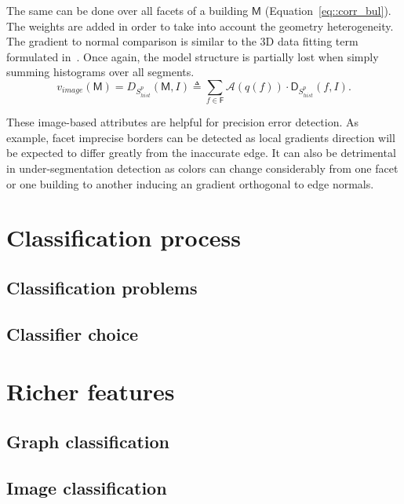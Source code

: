         The same can be done over all facets of a building $\mathsf{M}$ (Equation~\ref{eq::corr_bul}). The weights are added in order to take into account the geometry heterogeneity. The gradient to normal comparison is similar to the 3D data fitting term formulated in~\parencite{li2016boxfitting}. Once again, the model structure is partially lost when simply summing histograms over all segments.
        \begin{equation}
            \label{eq::corr_bul}
            v_{image}(\mathsf{M}) = D_{S_{hist}^p}(\mathsf{M}, I) \triangleq \sum_{f \in \mathsf{F}} \mathscr{A}(q(f)) \cdot \mathsf{D}_{S_{hist}^p}(f, I).
        \end{equation}
        
        These image-based attributes are helpful for precision error detection. As example, facet imprecise borders can be detected as local gradients direction will be expected to differ greatly from the inaccurate edge. It can also be detrimental in under-segmentation detection as colors can change considerably from one facet or one building to another inducing an gradient orthogonal to edge normals.

    \section{Classification process}
    \subsection{Classification problems}
    \subsection{Classifier choice}
    \subsection{}
\section{Richer features}
    \subsection{Graph classification}
    \subsection{Image classification}
